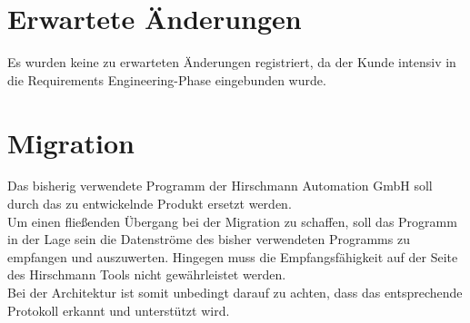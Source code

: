 \section{Erwartete Änderungen}
\label{sec:9:erw}

Es wurden keine zu erwarteten Änderungen registriert, da der Kunde intensiv in die Requirements Engineering-Phase eingebunden wurde.

\section{Migration}
\label{sec:9:mig}

Das bisherig verwendete Programm der Hirschmann Automation GmbH soll durch das zu entwickelnde Produkt ersetzt werden.\\
Um einen fließenden Übergang bei der Migration zu schaffen, soll das Programm in der Lage sein die Datenströme des bisher verwendeten Programms
zu empfangen und auszuwerten. Hingegen muss die Empfangsfähigkeit auf der Seite des Hirschmann Tools nicht gewährleistet werden.\\
Bei der Architektur ist somit unbedingt darauf zu achten, dass das entsprechende Protokoll erkannt und unterstützt wird.